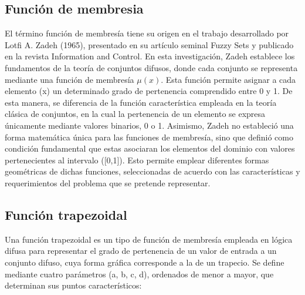 \subsection{Función de membresia}
El término función de membresía tiene su origen en el trabajo desarrollado por Lotfi A. Zadeh (1965), presentado en su artículo seminal Fuzzy Sets y publicado en la revista Information and Control. En esta investigación, Zadeh establece los fundamentos de la teoría de conjuntos difusos, donde cada conjunto se representa mediante una función de membresía $\mu(x)$. Esta función permite asignar a cada elemento (x) un determinado grado de pertenencia comprendido entre 0 y 1. De esta manera, se diferencia de la función característica empleada en la teoría clásica de conjuntos, en la cual la pertenencia de un elemento se expresa únicamente mediante valores binarios, 0 o 1. Asimismo, Zadeh no estableció una forma matemática única para las funciones de membresía, sino que definió como condición fundamental que estas asociaran los elementos del dominio con valores pertenecientes al intervalo ([0,1]). Esto permite emplear diferentes formas geométricas de dichas funciones, seleccionadas de acuerdo con las características y requerimientos del problema que se pretende representar.
\subsection{Función trapezoidal}
Una función trapezoidal es un tipo de función de membresía empleada en lógica difusa para representar el grado de pertenencia de un valor de entrada a un conjunto difuso, cuya forma gráfica corresponde a la de un trapecio. Se define mediante cuatro parámetros (a, b, c, d), ordenados de menor a mayor, que determinan sus puntos característicos:








